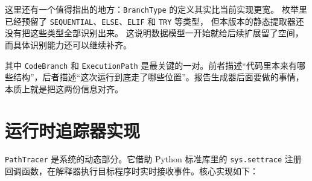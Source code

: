 这里还有一个值得指出的地方：\texttt{BranchType} 的定义其实比当前实现更宽。%
枚举里已经预留了 \texttt{SEQUENTIAL}、\texttt{ELSE}、\texttt{ELIF} 和 \texttt{TRY} 等类型，%
但本版本的静态提取器还没有把这些类型全部识别出来。%
这说明数据模型一开始就给后续扩展留了空间，而具体识别能力还可以继续补齐。

其中 \texttt{CodeBranch} 和 \texttt{ExecutionPath} 是最关键的一对。前者描述“代码里本来有哪些结构”，后者描述“这次运行到底走了哪些位置”。报告生成器后面要做的事情，本质上就是把这两份信息对齐。

\section{运行时追踪器实现}

\texttt{PathTracer} 是系统的动态部分。它借助 Python 标准库里的 \texttt{sys.settrace} 注册回调函数，在解释器执行目标程序时实时接收事件。核心实现如下：

